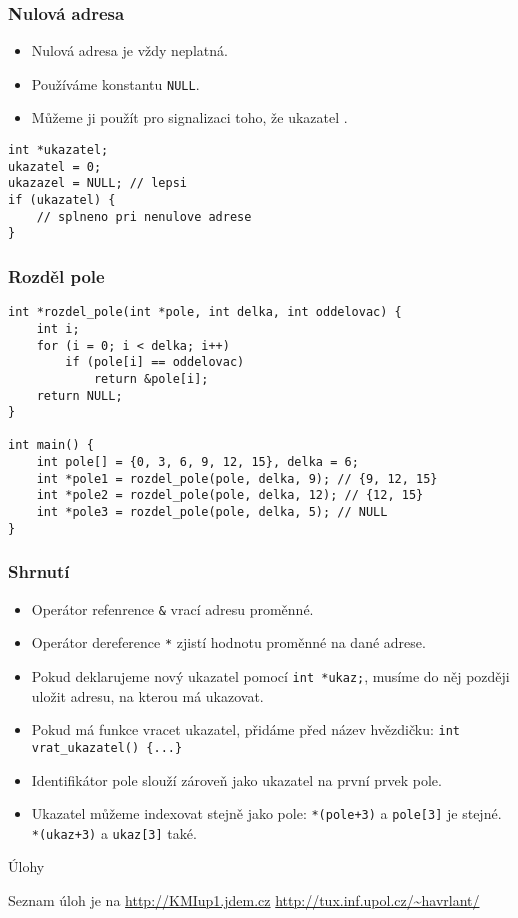 \documentclass{beamer}
\newenvironment{itemize4}%
  {\large \begin{itemize}%
    \setlength{\itemsep}{4pt}%
    \setlength{\parskip}{4pt}}%
  {\end{itemize}}
\newenvironment{itemizex}%
  {\large \begin{itemize}%
    \setlength{\itemsep}{8pt}%
    \setlength{\parskip}{8pt}}%
  {\end{itemize}}
\begin{document}
\begin{frame}[t,fragile]\frametitle{Nulová adresa} 
    \begin{itemizex}
        \item Nulová adresa je vždy neplatná.
        \item Používáme konstantu \texttt{NULL}.
        \item Můžeme ji použít pro signalizaci toho, že ukazatel .
    \end{itemizex}

\begin{verbatim} 
int *ukazatel;
ukazatel = 0; 
ukazazel = NULL; // lepsi
if (ukazatel) {
    // splneno pri nenulove adrese
}
\end{verbatim}
\end{frame}

\begin{frame}[t,fragile]\frametitle{Rozděl pole} 
\begin{verbatim} 
int *rozdel_pole(int *pole, int delka, int oddelovac) {
    int i;
    for (i = 0; i < delka; i++)
        if (pole[i] == oddelovac)
            return &pole[i];
    return NULL;
}

int main() {
    int pole[] = {0, 3, 6, 9, 12, 15}, delka = 6;
    int *pole1 = rozdel_pole(pole, delka, 9); // {9, 12, 15}
    int *pole2 = rozdel_pole(pole, delka, 12); // {12, 15}
    int *pole3 = rozdel_pole(pole, delka, 5); // NULL
}
\end{verbatim}
\end{frame}


\begin{frame}[t,fragile]\frametitle{Shrnutí} 
    \begin{itemize4}
        \item Operátor refenrence \texttt{\&} vrací adresu proměnné.
        \item Operátor dereference \texttt{*} zjistí hodnotu proměnné na dané adrese. 
        \item Pokud deklarujeme nový ukazatel pomocí \texttt{int *ukaz;}, musíme do něj později uložit adresu, na kterou má ukazovat.
        \item Pokud má funkce vracet ukazatel, přidáme před název hvězdičku: \texttt{int vrat\_ukazatel() \{...\}}
        \item Identifikátor pole slouží zároveň jako ukazatel na první prvek pole. 
        \item Ukazatel můžeme indexovat stejně jako pole: \texttt{*(pole+3)} a \texttt{pole[3]} je stejné. \texttt{*(ukaz+3)} a \texttt{ukaz[3]} také. 
    \end{itemize4}
\end{frame}


\begin{frame}[t,fragile]{Úlohy}
\begin{center}
\vskip 1cm
{\Large Seznam úloh je na \url{http://KMIup1.jdem.cz}}
\vskip 2cm
\url{http://tux.inf.upol.cz/~havrlant/}
\end{center}
\end{frame}
\end{document}
